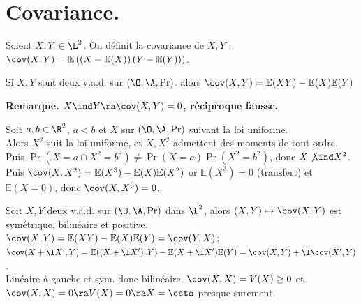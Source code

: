 \documentclass[11pt]{article}
\renewcommand*{\E}{\mathbb{E}}
\begin{document}
\section{Covariance.}

\begin{defi}{}{}
    Soient $X,Y\in\L^2$. On définit la covariance de $X,Y$ : $\cov(X,Y)=\E\left( \left( X-\E(X) \right) \left( Y - \E(Y) \right)\right)$.
\end{defi}

\vspace*{-0.5cm}

\begin{prop}{}{}
    Si $X,Y$ sont deux v.a.d. sur $(\O,\A,\Pr)$. alors $\cov(X,Y)=\E(XY)-\E(X)\E(Y)$
\end{prop}

\vspace*{-0.5cm}

\bf{Remarque.} $X\ind Y \ra \cov(X,Y) = 0$, réciproque fausse.

\begin{ex}{}{}
    Soit $a,b\in\R^2$, $a<b$ et $X$ sur $(\O,\A,\Pr)$ suivant la loi uniforme.\\
    Alors $X^2$ suit la loi uniforme, et $X,X^2$ admettent des moments de tout ordre.\\
    Puis $\Pr(X=a\cap X^2=b^2)\neq \Pr(X=a)\Pr(X^2=b^2)$, donc $X\not\ind X^2$.\\
    Puis $\cov(X,X^2)=\E(X^3) - \E(X)\E(X^2)$ or $\E(X^3)=0$ (transfert) et $\E(X=0)$, donc $\cov(X,X^3)=0$.
\end{ex}

\vspace*{-0.8cm}

\begin{prop}{}{}
    Soit $X,Y$ deux v.a.d. sur $(\O,\A,\Pr)$ dans $\L^2$, alors $(X,Y)\mapsto \cov(X,Y)$ est symétrique, bilinéaire et positive.
    \tcblower
    $\cov(X,Y)=\E(XY)-\E(X)\E(Y)=\cov(Y,X)$; $\cov(X+\l X',Y)=\E((X+\l X'), Y) - \E(X+\l X')\E(Y)=\cov(X,Y)+\l\cov(X',Y)$.\\
    Linéaire à gauche et sym. donc bilinéaire. $\cov(X,X)=V(X)\geq0$ et $\cov(X,X)=0\ra V(X)=0\ra X=\cste$ presque surement.
\end{prop}

\vspace*{-0.8cm}
\end{document}
